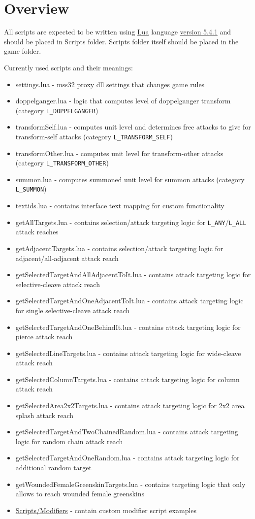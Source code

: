 \section{Overview}
All scripts are expected to be written using \href{https://www.lua.org/}{Lua} language \href{https://www.lua.org/ftp/lua-5.4.1.tar.gz}{version 5.4.1} and should be placed in Scripts folder. Scripts folder itself should be placed in the game folder.


Currently used scripts and their meanings:
\begin{itemize}
\item settings.lua - mss32 proxy dll settings that changes game rules
\item doppelganger.lua - logic that computes level of doppelganger transform (category \texttt{L\_DOPPELGANGER})
\item transformSelf.lua - computes unit level and determines free attacks to give for transform-self attacks (category \texttt{L\_TRANSFORM\_SELF})
\item transformOther.lua - computes unit level for transform-other attacks (category \texttt{L\_TRANSFORM\_OTHER})
\item summon.lua - computes summoned unit level for summon attacks (category \texttt{L\_SUMMON})
\item textids.lua - contains interface text mapping for custom functionality
\item getAllTargets.lua - contains selection/attack targeting logic for \texttt{L\_ANY}/\texttt{L\_ALL} attack reaches
\item getAdjacentTargets.lua - contains selection/attack targeting logic for adjacent/all-adjacent attack reach
\item getSelectedTargetAndAllAdjacentToIt.lua - contains attack targeting logic for selective-cleave attack reach
\item getSelectedTargetAndOneAdjacentToIt.lua - contains attack targeting logic for single selective-cleave attack reach
\item getSelectedTargetAndOneBehindIt.lua - contains attack targeting logic for pierce attack reach
\item getSelectedLineTargets.lua - contains attack targeting logic for wide-cleave attack reach
\item getSelectedColumnTargets.lua - contains attack targeting logic for column attack reach
\item getSelectedArea2x2Targets.lua - contains attack targeting logic for 2x2 area splash attack reach
\item getSelectedTargetAndTwoChainedRandom.lua - contains attack targeting logic for random chain attack reach
\item getSelectedTargetAndOneRandom.lua - contains attack targeting logic for additional random target
\item getWoundedFemaleGreenskinTargets.lua - contains targeting logic that only allows to reach wounded female greenskins
\item \href{https://github.com/VladimirMakeev/D2ModdingToolset/tree/master/Scripts/Modifiers}{Scripts/Modifiers} - contain custom modifier script examples
\end{itemize}
